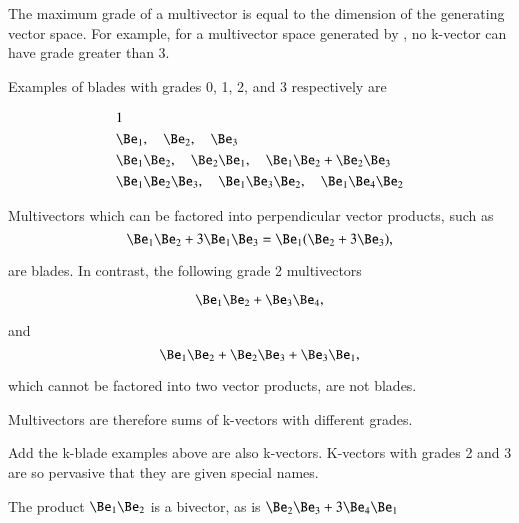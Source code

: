 The maximum grade of a multivector is equal to the dimension of the generating vector space.
For example, for a multivector space generated by , no k-vector can have grade greater than 3.

Examples of blades with grades 0, 1, 2, and 3 respectively are

\begin{dmath}\label{eqn:multivector:180}
\begin{aligned}
&1 \\
&\Be_1,\quad \Be_2,\quad \Be_3 \\
&\Be_1 \Be_2,\quad \Be_2 \Be_1,\quad \Be_1 \Be_2 + \Be_2 \Be_3 \\
&\Be_1 \Be_2 \Be_3,\quad \Be_1 \Be_3 \Be_2,\quad \Be_1 \Be_4 \Be_2
\end{aligned}
\end{dmath}

Multivectors which can be factored into perpendicular vector products, such as
\begin{dmath}\label{eqn:multiplication:220}
\Be_1 \Be_2 + 3 \Be_1 \Be_3
=
\Be_1 (\Be_2 + 3 \Be_3),
\end{dmath}

are blades.  In contrast, the following grade 2 multivectors

\begin{dmath}\label{eqn:multiplication:240}
\Be_1 \Be_2 + \Be_3 \Be_4,
\end{dmath}

and
\begin{dmath}\label{eqn:multiplication:260}
\Be_1 \Be_2 + \Be_2 \Be_3 + \Be_3 \Be_1,
\end{dmath}

which cannot be factored into two vector products, are not blades.


Multivectors are therefore sums of k-vectors with different grades.

Add the k-blade examples above are also k-vectors.
K-vectors with grades 2 and 3 are so pervasive that they are given special names.


The product \( \Be_1 \Be_2 \) is a bivector, as is \( \Be_2 \Be_3 + 3 \Be_4 \Be_1 \)


